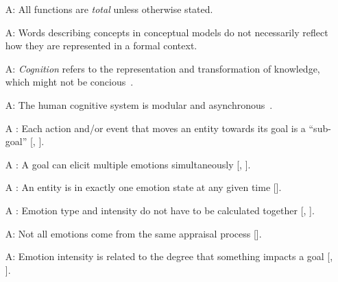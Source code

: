 \begin{itemize}

    \item[A\refstepcounter{assumpnum}\theassumpnum \label{A_TotalFunctions}:]
    All functions are \textit{total} unless otherwise stated.

    \item[A\refstepcounter{assumpnum}\theassumpnum \label{A_formal}:]
    Words describing concepts in conceptual models do not necessarily reflect
    how they are represented in a formal context.

    \item[A\refstepcounter{assumpnum}\theassumpnum \label{A_Cognition}:]
    \textit{Cognition} refers to the representation and transformation of
    knowledge, which might not be concious~\citep[p.~30]{oatley1987towards}.

    \item[A\refstepcounter{assumpnum}\theassumpnum \label{A_Modular}:]
    The human cognitive system is modular and
    asynchronous~\citep[p.~31]{oatley1987towards}.

    \item[A\refstepcounter{assumpnum}\theassumpnum 
    \label{A_Subgoal}:] Each action and/or event that moves an entity towards 
    its goal is a ``sub-goal'' [, 
    ].

    \item[A\refstepcounter{assumpnum}\theassumpnum 
    \label{A_Goal2Emotion}:] A goal can elicit multiple emotions simultaneously 
    [, ].

    \item[A\refstepcounter{assumpnum}\theassumpnum 
    \label{A_OneState}:] An entity is in exactly one emotion state at any given 
    time [].

    \item[A\refstepcounter{assumpnum}\theassumpnum 
    \label{A_EmotionTypeIntensity}:] Emotion type and intensity do not have to 
    be calculated together [, 
    ].

    \item[A\refstepcounter{assumpnum}\theassumpnum \label{A_AppraisalProcess}:]
    Not all emotions come from the same appraisal process 
    [].

    \item[A\refstepcounter{assumpnum}\theassumpnum \label{A_Goal2Intensity}:]
    Emotion intensity is related to the degree that something impacts a goal 
    [, ].


\end{itemize}
